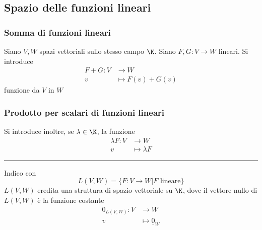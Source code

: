 


\subsection{Spazio delle funzioni lineari}
\subsubsection{Somma di funzioni lineari}

Siano $ V, W $ spazi vettoriali sullo stesso campo $ \K $. Siano $ F, G: V\to W $ lineari. Si introduce \begin{align*}
F+G: V & \to  W \\
 v & \mapsto F(v)+G(v)
\end{align*}
funzione da $ V $ in $ W $


\subsubsection{Prodotto per scalari di funzioni lineari}

Si introduce inoltre, se $ \lambda \in \K $, la funzione \begin{align*}
\lambda F:V & \to W \\
v & \mapsto \lambda F
\end{align*}


\rule{7em}{.4pt}

Indico con \[
    L(V, W)=\{F:V\to W | F \text{ lineare}\}
\]
$ L(V,W) $ eredita una struttura di spazio vettoriale su $ \K $, dove il vettore nullo di $ L(V,W) $ è la funzione costante \begin{align*}
0_{L(V,W)}: V & \to W \\
v & \mapsto \underline{0}_W
\end{align*}